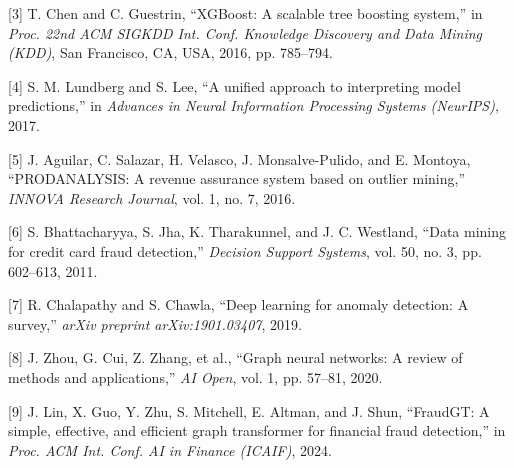 \documentclass[conference]{IEEEtran}
\begin{document}
[3] T. Chen and C. Guestrin, “XGBoost: A scalable tree boosting system,” in \textit{Proc. 22nd ACM SIGKDD Int. Conf. Knowledge Discovery and Data Mining (KDD)}, San Francisco, CA, USA, 2016, pp. 785–794.

[4] S. M. Lundberg and S. Lee, “A unified approach to interpreting model predictions,” in \textit{Advances in Neural Information Processing Systems (NeurIPS)}, 2017.

[5] J. Aguilar, C. Salazar, H. Velasco, J. Monsalve-Pulido, and E. Montoya, “PRODANALYSIS: A revenue assurance system based on outlier mining,” \textit{INNOVA Research Journal}, vol. 1, no. 7, 2016.

[6] S. Bhattacharyya, S. Jha, K. Tharakunnel, and J. C. Westland, “Data mining for credit card fraud detection,” \textit{Decision Support Systems}, vol. 50, no. 3, pp. 602–613, 2011.

[7] R. Chalapathy and S. Chawla, “Deep learning for anomaly detection: A survey,” \textit{arXiv preprint arXiv:1901.03407}, 2019.

[8] J. Zhou, G. Cui, Z. Zhang, et al., “Graph neural networks: A review of methods and applications,” \textit{AI Open}, vol. 1, pp. 57–81, 2020.

[9] J. Lin, X. Guo, Y. Zhu, S. Mitchell, E. Altman, and J. Shun, “FraudGT: A simple, effective, and efficient graph transformer for financial fraud detection,” in \textit{Proc. ACM Int. Conf. AI in Finance (ICAIF)}, 2024.
\end{document}
